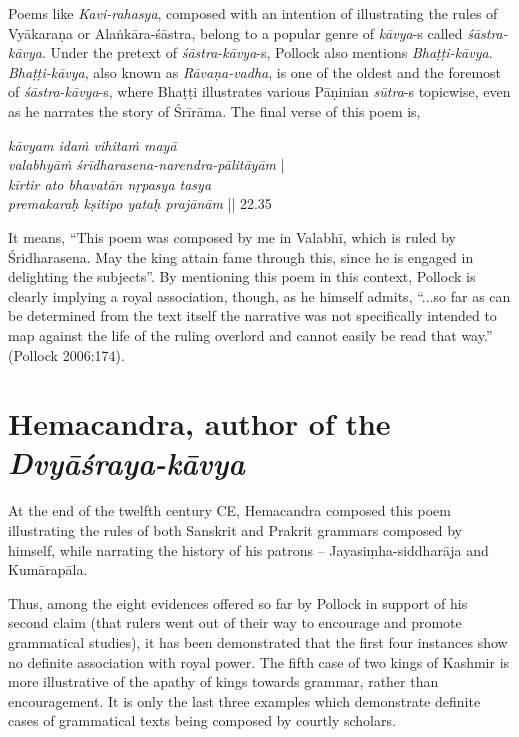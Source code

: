 Poems like {\sl Kavi-rahasya}, composed with an intention of illustrating the rules of Vyākaraṇa or Alaṅkāra-śāstra, belong to a popular genre of {\sl kāvya}-s called {\sl śāstra-kāvya}. Under the pretext of {\sl śāstra-kāvya}-s, Pollock also mentions {\sl Bhaṭṭi-kāvya}. {\sl Bhaṭṭi-kāvya}, also known as {\sl Rāvaṇa-vadha}, is one of the oldest and the foremost of {\sl śāstra-kāvya}-s, where Bhaṭṭi illustrates various Pāṇinian {\sl sūtra}-s topicwise, even as he narrates the story of Śrīrāma. The final verse of this poem is,
\begin{myquote}
{{\sl kāvyam idaṁ vihitaṁ mayā}}\\
\phantom{\quad} {{\sl valabhyāṁ śrīdharasena-narendra-pālitāyām}} |\\
{{\sl kīrtir ato bhavatān nṛpasya tasya}}\\ 
\phantom{\quad} {{\sl  premakaraḥ kṣitipo yataḥ prajānām}} || 22.35 
\end{myquote}
It means, ``This poem was composed by me in Valabhī, which is ruled by Śridharasena. May the king attain fame through this, since he is engaged in delighting the subjects''. By mentioning this poem in this context, Pollock is clearly implying a royal association, though, as he himself admits, ``...so far as can be determined from the text itself the narrative was not specifically intended to map against the life of the ruling overlord and cannot easily be read that way.'' (Pollock 2006:174). 

\section{Hemacandra, author of the {\sl\bfseries Dvyāśraya-kāvya}}\label{chap3-sec15}

At the end of the twelfth century CE, Hemacandra composed this poem illustrating the rules of both Sanskrit and Prakrit grammars composed by himself, while narrating the history of his patrons -- Jayasiṃha-siddharāja and Kumārapāla.

Thus, among the eight evidences offered so far by Pollock in support of his second claim (that rulers went out of their way to encourage and promote grammatical studies), it has been demonstrated that the first four instances show no definite association with royal power. The fifth case of two kings of Kashmir is more illustrative of the apathy of kings towards grammar, rather than encouragement. It is only the last three examples which demonstrate definite cases of grammatical texts being composed by courtly scholars.

